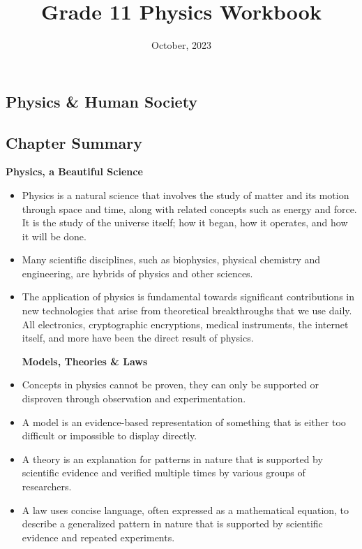 \documentclass[12pt,addpoints]{exam}
\date{October, 2023}
\begin{document}
	\title{Grade 11 Physics Workbook}
	\maketitle
	
	\begin{center}
		\section*{Physics \& Human Society}
		\subsection*{Chapter Summary}
		\textbf{Physics, a Beautiful Science} 
	\end{center}
		
	\begin{itemize}
		\item Physics is a natural science that involves the study of matter and its motion through space and time, along with related concepts such as energy and force. It is the study of the universe itself; how it began, how it operates, and how it will be done.
		\item Many scientific disciplines, such as biophysics, physical chemistry and engineering, are hybrids of physics and other sciences.
		\item The application of physics is fundamental towards significant contributions in new technologies that arise from theoretical breakthroughs that we use daily. All electronics, cryptographic encryptions, medical instruments, the internet itself, and more have been the direct result of physics.
		\begin{center}
			\textbf{Models, Theories \& Laws} 
		\end{center}
		\item Concepts in physics cannot be proven, they can only be supported or disproven through observation and experimentation. 
		\item A model is an evidence-based representation of something that is either too difficult or impossible to display directly.
		\item A theory is an explanation for patterns in nature that is supported by scientific evidence and verified multiple times by various groups of researchers.
		\item A law uses concise language, often expressed as a mathematical equation, to describe a generalized pattern in nature that is supported by scientific evidence and repeated experiments.

\end{itemize}
\end{document}
